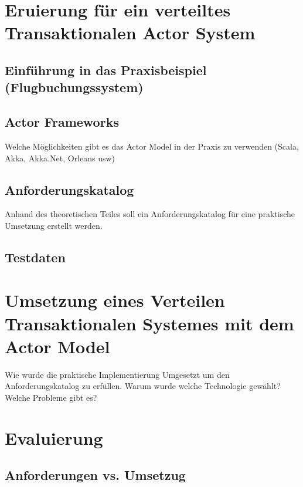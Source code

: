 
\chapter{Eruierung für ein verteiltes Transaktionalen Actor System }
\section{Einführung in das Praxisbeispiel (Flugbuchungssystem)}
\section{Actor Frameworks}\label{sec:ActorFrameworks}
Welche Möglichkeiten gibt es das Actor Model in der Praxis zu verwenden (Scala, Akka, Akka.Net, Orleans usw)

\section{Anforderungskatalog}
Anhand des theoretischen Teiles soll ein Anforderungskatalog für eine praktische Umsetzung erstellt werden.

\section{Testdaten}

\chapter{Umsetzung eines Verteilen Transaktionalen Systemes mit dem Actor Model}
Wie wurde die praktische Implementierung Umgesetzt um den Anforderungskatalog zu erfüllen. Warum wurde welche Technologie gewählt? Welche Probleme gibt es? 

\chapter{Evaluierung}
\section{Anforderungen vs. Umsetzug}

